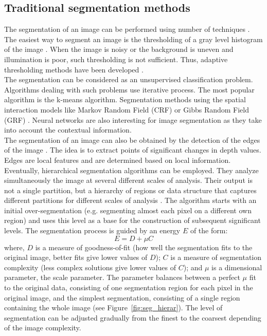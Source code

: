 \subsection{Traditional segmentation methods}
The segmentation of an image can be performed using number of techniques \citep{pal1993review}. \\

The easiest way to segment an image is the thresholding of a gray level histogram of the image \citep{taxt1989segmentation}. When the image is noisy or the background is uneven and illumination is poor, such thresholding is not sufficient. Thus, adaptive thresholding methods have been developed \citep{yanowitz1989new}. \\

The segmentation can be considered as an unsupervised classification problem. Algorithms dealing with such problems use iterative process. The most popular algorithm is the k-means algorithm. Segmentation methods using the spatial interaction models like Markov Random Field (CRF) \citep{hansen1982image} or Gibbs Random Field (GRF) \citep{derin1987modeling}. Neural networks are also interesting for  image segmentation \citep{ghosh1991image} as they take into account the contextual information. \\

The segmentation of an image can also be obtained by the detection of the edges of the image \citep{peli1982study}. The idea is to extract points of significant changes in depth values. Edges are local features and are determined based on local information. \\

Eventually, hierarchical segmentation algorithms can be employed. They analyze simultaneously the image at several different scales of analysis. Their output is not a single partition, but a hierarchy of regions or data structure that captures different partitions for different scales of analysis \citep{trias2006semi, guigues2006scale, baatz2004method}. The algorithm starts with an initial over-segmentation (e.g. segmenting almost each pixel on a different own region) and uses this level as a base for the construction of subsequent significant levels. The segmentation process is guided by an energy $E$ of the form:
\begin{equation}
E = D + \mu C
\end{equation}
where, $D$ is a measure of goodness-of-fit (how well the segmentation fits to the original image, better fits give lower values of $D$); $C$ is a measure of segmentation complexity (less complex solutions give lower values of $C$); and $\mu$ is a dimensional parameter, the scale parameter. The parameter balances between a perfect $\mu$ fit to the original data, consisting of one segmentation region for each pixel in the original image, and the simplest segmentation, consisting of a single region containing the whole image \citep{guigues2006scale} (see Figure~\ref{fig:seg_hierar}). The level of segmentation can be adjusted gradually from the finest to the coarsest depending of the image complexity.

